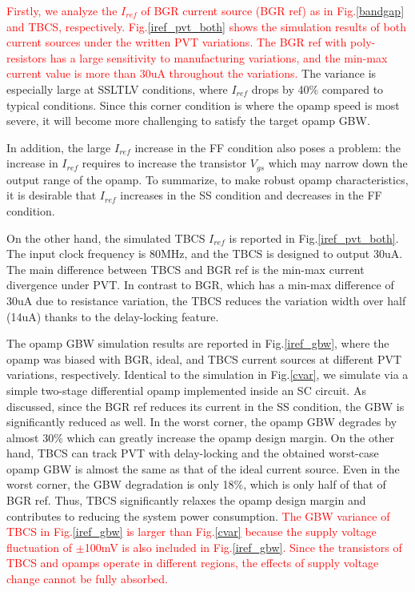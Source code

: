 \documentclass[paper]{ieice}
\begin{document}
\textcolor{red}{Firstly, we analyze the $I_{ref}$ of BGR current source (BGR ref)\cite{banba1999cmos} as in Fig.\ref{bandgap} and TBCS, respectively. Fig.\ref{iref_pvt_both} shows the simulation results of both current sources under the written PVT variations. The BGR ref with poly-resistors has a large sensitivity to manufacturing variations, and the min-max current value is more than 30uA throughout the variations.} The variance is especially large at SSLTLV conditions, where $I_{ref}$ drops by 40\% compared to typical conditions.
Since this corner condition is where the opamp speed is most severe, it will become more challenging to satisfy the target opamp GBW. %

In addition, the large $I_{ref}$ increase in the FF condition also poses a problem: the increase in $I_{ref}$ requires to increase the transistor $V_{gs}$ which may narrow down the output range of the opamp. To summarize, to make robust opamp characteristics, it is desirable that $I_{ref}$ increases in the SS condition and decreases in the FF condition.

On the other hand, the simulated TBCS $I_{ref}$ is reported in Fig.\ref{iref_pvt_both}. The input clock frequency is 80MHz, and the TBCS is designed to output 30uA. The main difference between TBCS and BGR ref is the min-max current divergence under PVT. In contrast to BGR, which has a min-max difference of 30uA due to resistance variation, the TBCS reduces the variation width over half (14uA) thanks to the delay-locking feature.

The opamp GBW simulation results are reported in Fig.\ref{iref_gbw}, where the opamp was biased with BGR, ideal, and TBCS current sources at different PVT variations, respectively. Identical to the simulation in Fig.\ref{cvar}, we simulate via a simple two-stage differential opamp implemented inside an SC circuit.
As discussed, since the BGR ref reduces its current in the SS condition, the GBW is significantly reduced as well. In the worst corner, the opamp GBW degrades by almost 30\% which can greatly increase the opamp design margin.
On the other hand, TBCS can track PVT with delay-locking and the obtained worst-case opamp GBW is almost the same as that of the ideal current source. Even in the worst corner, the GBW degradation is only 18\%, which is only half of that of BGR ref. Thus, TBCS significantly relaxes the opamp design margin and contributes to reducing the system power consumption.
\textcolor{red}{The GBW variance of TBCS in Fig.\ref{iref_gbw} is larger than Fig.\ref{cvar} because the supply voltage fluctuation of $\pm$100mV is also included in Fig.\ref{iref_gbw}. Since the transistors of TBCS and opamps operate in different regions, the effects of supply voltage change cannot be fully absorbed.}
\end{document}
